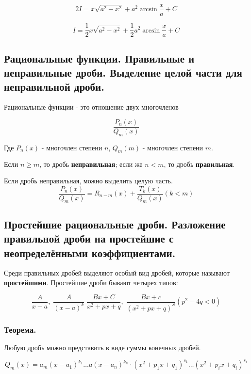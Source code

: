 \documentclass[a4paper,12pt]{article}
\theoremstyle{plain} %
\theoremstyle{definition} %
\theoremstyle{remark} %
\begin{document}
\[
	2I = x\sqrt{a^2 - x^2} + a^2 \arcsin{\frac{x}{a}} + C
\]

\[
	I = \frac{1}{2} x \sqrt{a^2 - x^2} + \frac{1}{2} a^2 \arcsin{\frac{x}{a}} + C
\]

\newpage
\subsection*{Рациональные функции. Правильные и неправильные дроби. Выделение целой части для неправильной дроби.}

Рациональные функции - это отношение двух многочленов

\[
	\frac{P_n(x)}{Q_m(x)}
\]

Где $P_n(x)$ - многочлен степени $n$, $Q_m(m)$ - многочлен степени $m$.

Если $n \ge m$, то дробь \textbf{неправильная}; если же $n < m$, то дробь \textbf{правильная}.

\begin{center}
	Если дробь неправильная, можно выделить целую часть.
	\[
		\frac{P_n(x)}{Q_m(x)} = R_{n-m}(x) + \frac{T_k(x)}{Q_m(x)} (k < m)
	\]
\end{center}




\newpage
\subsection*{Простейшие рациональные дроби. Разложение правильной дроби на простейшие с неопределёнными коэффициентами.}

Среди правильных дробей выделяют особый вид дробей, которые называют \textbf{простейшими}. Простейшие дроби бывают четырех типов:

\[ \frac{A}{x - a}, \; \frac{A}{(x - a)^k} \; \frac{Bx + C}{x^2 + px + q}, \; \frac{Bx+c}{(x^2 + px + q)^S} (p^2 - 4q < 0) \]

\subsubsection*{Теорема.}
Любую дробь можно представить в виде суммы конечных дробей.

\[
	Q_m(x) = a_m(x - a_1)^{k_1} \dots a(x - a_n)^{k_n} \cdot (x^2 + p_1x + q_1)^{s_1} \dots (x^2 + p_ix + q_i)^{s_i}
\]
\end{document}
